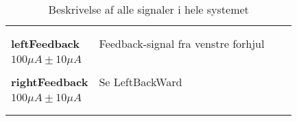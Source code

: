 \begin{longtable}{ p{} p{} p{} p{} }
\begin{tabular}{l}
		$ 100 \mu A \pm 10 \mu A $\\
		\end{tabular}& \phantom{}  \\\hdashline
		\textbf{leftFeedback} & Feedback-signal fra venstre forhjul & 
		\begin{tabular}{l}
		$ 0-5 V \pm 0.5 V $\\
		$ 100 \mu A \pm 10 \mu A $\\
		\end{tabular}& \phantom{}  \\\hdashline
		\textbf{rightFeedback} & Se LeftBackWard & 
		\begin{tabular}{l}
		$ 0-5 V \pm 0.5 V $\\
		$ 100 \mu A \pm 10 \mu A $\\
		\end{tabular}& \phantom{}  \\\hdashline
		\caption{Beskrivelse af alle signaler i hele systemet}
		\label{tab:blokogsignalbeskrivelse}
	\end{longtable}
